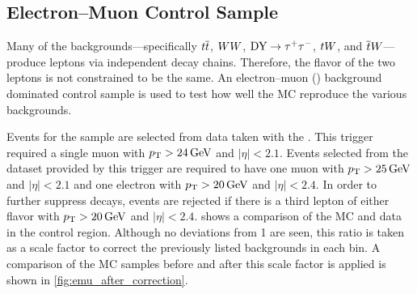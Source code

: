 


\subsection{Electron--Muon Control Sample}
\label{ssec:emu_sample}

Many of the backgrounds---specifically $t \overline{t}$, $W W$, $\text{DY} \to \tau^{+} \tau^{-}$, $t W$,
and $\overline{t} W$---produce leptons via independent decay chains. Therefore, the
flavor of the two leptons is not constrained to be the same. An electron--muon
(\emu) background dominated control sample is used to test how well the MC
reproduce the various backgrounds.

Events for the \emu sample are selected from data taken with the
\SingleMuonTrigger. This trigger required a single muon with $p_{\mathrm{T}} > 24 \,\text{Ge\hspace{-.08em}V}$
and $|\eta| < 2.1$. Events selected from the dataset provided by this trigger
are required to have one muon with $p_{\mathrm{T}} > 25 \,\text{Ge\hspace{-.08em}V}$ and $|\eta| < 2.1$ and one
electron with $p_{\mathrm{T}} > 20 \,\text{Ge\hspace{-.08em}V}$ and $|\eta| < 2.4$. In order to further suppress
\Z decays, events are rejected if there is a third lepton of either flavor with
$p_{\mathrm{T}} > 20 \,\text{Ge\hspace{-.08em}V}$ and $|\eta| < 2.4$.  shows a
comparison of the MC and data in the control region. Although no deviations
from \num{1} are seen, this ratio is taken as a scale factor to correct the
previously listed backgrounds in each bin. A comparison of the \Ztomumu MC
samples before and after this scale factor is applied is shown in
\cref{fig:emu_after_correction}.

